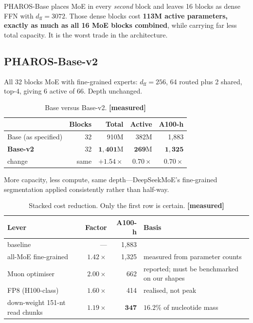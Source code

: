 \documentclass[11pt,a4paper]{article}
\newcommand{\meas}{\textcolor{measured}{\textbf{[measured]}}}
\begin{document}
PHAROS-Base places MoE in every \emph{second} block and leaves 16 blocks as dense
FFN with $d_{\text{ff}} = 3072$. Those dense blocks cost \textbf{113M active
parameters, exactly as much as all 16 MoE blocks combined}, while carrying far
less total capacity. It is the worst trade in the architecture.

\subsection{PHAROS-Base-v2}

All 32 blocks MoE with fine-grained experts: $d_{\text{ff}} = 256$, 64 routed
plus 2 shared, top-4, giving 6 active of 66. Depth unchanged.

\begin{table}[h]
\centering
\caption{Base versus Base-v2. \meas}
\small
\begin{tabular}{@{}lrrrr@{}}
\toprule
 & \textbf{Blocks} & \textbf{Total} & \textbf{Active} & \textbf{A100-h} \\
\midrule
Base (as specified) & 32 & 910M & 382M & 1{,}883 \\
\textbf{Base-v2} & 32 & $\mathbf{1{,}401}$M & $\mathbf{269}$M & $\mathbf{1{,}325}$ \\
change & same & $+1.54\times$ & $0.70\times$ & $0.70\times$ \\
\bottomrule
\end{tabular}
\end{table}

More capacity, less compute, same depth---DeepSeekMoE's fine-grained segmentation
applied consistently rather than half-way.

\begin{table}[h]
\centering
\caption{Stacked cost reduction. Only the first row is certain. \meas}
\small
\begin{tabular}{@{}>{\raggedright\arraybackslash}p{5.0cm}rr>{\raggedright\arraybackslash}p{5.4cm}@{}}
\toprule
\textbf{Lever} & \textbf{Factor} & \textbf{A100-h} & \textbf{Basis} \\
\midrule
baseline & --- & 1{,}883 & \\
all-MoE fine-grained & $1.42\times$ & 1{,}325 & measured from parameter counts \\
Muon optimiser & $2.00\times$ & 662 & reported; must be benchmarked on our shapes \\
FP8 (H100-class) & $1.60\times$ & 414 & realised, not peak \\
down-weight 151-nt read chunks & $1.19\times$ & $\mathbf{347}$ & $16.2\%$ of nucleotide mass \\
\bottomrule
\end{tabular}
\end{table}
\end{document}
